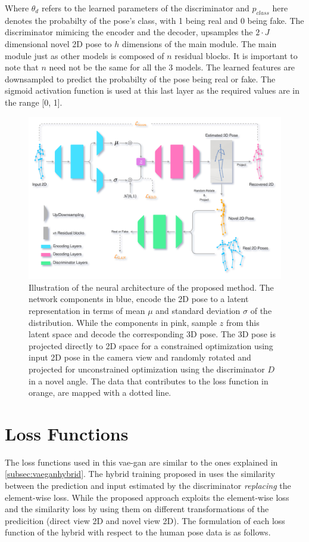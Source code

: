 Where $\theta_d$ refers to the learned parameters of the discriminator and $p_{class}$ here denotes the probabilty of the pose's class, with 1 being real and 0 being fake. The discriminator mimicing the encoder and the decoder, upsamples the $2\!\cdot\!J$ dimensional novel 2D pose to $h$ dimensions of the main module. The main module just as other models is composed of $n$ residual blocks. It is important to note that $n$ need not be the same for all the 3 models. The learned features are downsampled to predict the probabilty of the pose being real or fake. The sigmoid activation function is used at this last layer as the required values are in the range [0, 1]. %

\begin{figure}[h] 
    \centering
    \includegraphics[width=\textwidth]{figures/arch/method_arch.png}
    \caption{Illustration of the neural architecture of the proposed method. The network components in blue, encode the 2D pose to a latent representation in terms of mean $\mu$ and standard deviation $\sigma$ of the distribution. While the components in pink, sample $z$ from this latent space and decode the corresponding 3D pose. The 3D pose is projected directly to 2D space for a constrained optimization using input 2D pose in the camera view and randomly rotated and projected for unconstrained optimization using the discriminator $D$ in a novel angle. The data that contributes to the loss function in orange, are mapped with a dotted line.
    }
    \label{fig:method_arch}
\end{figure}

\section{Loss Functions}
\label{sec:loss_fn}
The loss functions used in this \ac{vae}-\ac{gan} are similar to the ones explained in \ref{subsec:vaeganhybrid}. The hybrid training proposed in \cite{autoencoding_beyond_pixels} uses the similarity between the prediction and input estimated by the discriminator \textit{replacing} the element-wise loss. While the proposed approach exploits the element-wise loss and the similarity loss by using them on different transformations of the predicition (direct view 2D and novel view 2D). The formulation of each loss function of the hybrid with respect to the human pose data is as follows.


